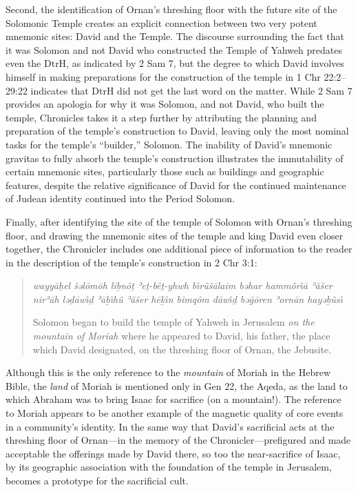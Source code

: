 Second, the identification of Ornan's threshing floor with the future
site of the Solomonic Temple creates an explicit connection between two
very potent mnemonic sites: David and the Temple. The discourse
surrounding the fact that it was Solomon and not David who constructed
the Temple of Yahweh predates even the DtrH, as indicated by 2 Sam 7,
but the degree to which David involves himself in making preparations
for the construction of the temple in 1 Chr 22:2--29:22 indicates that
DtrH did not get the last word on the matter. While 2 Sam 7 provides an
apologia for why it was Solomon, and not David, who built the temple,
Chronicles takes it a step further by attributing the planning and
preparation of the temple's construction to David, leaving only the most
nominal tasks for the temple's ``builder,'' Solomon. The inability of
David's mnemonic gravitas to fully absorb the temple's construction
illustrates the immutability of certain mnemonic sites, particularly
those such as buildings and geographic features, despite the relative
significance of David for the continued maintenance of Judean identity
continued into the \secondtemple Period \visavis
Solomon.

Finally, after identifying the site of the temple of Solomon with
Ornan's threshing floor, and drawing the mnemonic sites of the temple
and king David even closer together, the Chronicler includes one
additional piece of information to the reader in the description of the
temple's construction in 2 Chr 3:1:

\begin{quote}
\emph{wayyāḥel šəlōmōh liḇnôṯ ʾeṯ-bêṯ-yhwh bı̂rûšālaim bəhar hammôrı̂ā
ʾăšer nirʾāh ləḏāwı̂ḏ ʾāḇı̂hû ʾăšer hēḵı̂n bimqôm dāwı̂ḏ bəḡōren ʾornān
hayəḇûsı̂}

Solomon began to build the temple of Yahweh in Jerusalem \emph{on the
mountain of Moriah} where he appeared to David, his father, the place
which David designated, on the threshing floor of Ornan, the Jebusite.
\end{quote}

Although this is the only reference to the \emph{mountain} of Moriah in
the Hebrew Bible, the \emph{land} of Moriah is mentioned only in Gen 22,
the Aqeda, as the land to which Abraham was to bring Isaac for sacrifice
(on a mountain!).\autocite[358--359]{kalimi_htr1990} The reference to
Moriah appears to be another example of the magnetic quality of core
events in a community's identity. In the same way that David's
sacrificial acts at the threshing floor of Ornan---in the memory of the
Chronicler---prefigured and made acceptable the offerings made by David
there, so too the near-sacrifice of Isaac, by its geographic association
with the foundation of the temple in Jerusalem, becomes a prototype for
the sacrificial cult.\autocite[In fact, \vermes makes
this point explicit and traces the tradition into early Christianity.
See][204--211]{vermes1961}

